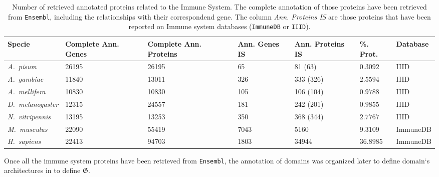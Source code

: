 \documentclass[12pt]{article}
\begin{document}
\begin{table}[ht!]
\begin{center}
\caption{Number of retrieved annotated proteins related to the Immune System. 
  The complete annotation of those proteins have been retrieved from \texttt{Ensembl}, including the relationships with their correspondend gene. The column \textsl{Ann. Proteins IS} are those proteins that have been reported on Immune system databases (\texttt{ImmuneDB} or \texttt{IIID}).} 
\label{tab:start}
\begin{tabular}{lp{2cm}p{2cm}p{2cm}p{2cm}p{1.5cm}l}
\toprule
\textbf{Specie} & \textbf{Complete Ann. Genes} & \textbf{Complete Ann. 
Proteins} & \textbf{Ann. Genes IS} & \textbf{Ann. Proteins IS} & \textbf{\%. Prot.} 
& \textbf{Database}\\
\midrule
\textit{A.\ pisum} & 26195 & 26195 & 65 & 81 (63) & $0.3092$ & IIID\\
\textit{A.\ gambiae} & 11840 & 13011 & 326 & 333 (326) & $2.5594$ & IIID\\
\textit{A.\ mellifera} & 10830 & 10830 & 105 & 106 (104) & $0.9788$ & IIID\\
\textit{D.\ melanogaster} & 12315 & 24557 & 181 & 242 (201) & $0.9855$ & IIID\\
\textit{N.\ vitripennis} & 13195 & 13253 & 350 & 368 (344) & $2.7767$ & IIID\\
\midrule
\textit{M.\ musculus} & 22090 & 55419 & 7043 & 5160 & $9.3109$ & 
ImmuneDB\\
\textit{H.\ sapiens} & 22413 & 94703 & 1803 & 34944 & $36.8985$ & 
ImmuneDB\\
\bottomrule
\end{tabular}
\end{center}
\end{table}

Once all the immune system proteins have been retrieved from \texttt{Ensembl}, the annotation of domains was organized later to define domain`s architectures in to define $\boldsymbol{\mathfrak{G}}$.
\end{document}
